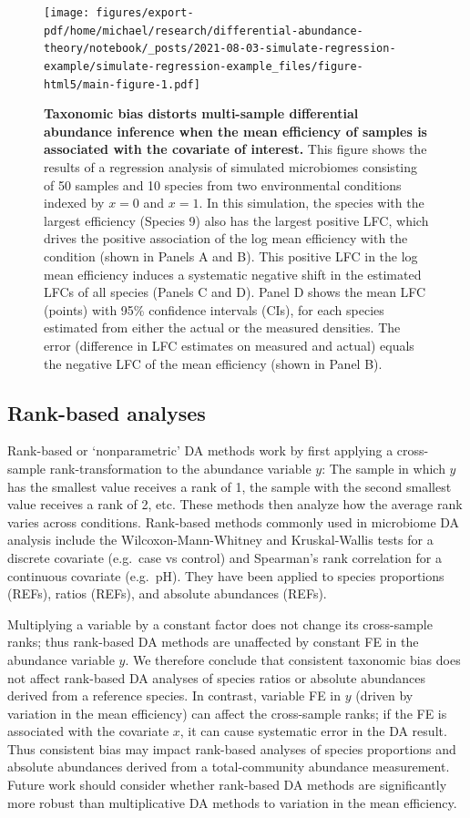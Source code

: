 \documentclass[
]{article}
\begin{document}
\begin{figure}
\centering
\texttt{[image: figures/export-pdf/home/michael/research/differential-abundance-theory/notebook/\_posts/2021-08-03-simulate-regression-example/simulate-regression-example\_files/figure-html5/main-figure-1.pdf]}
\caption{\label{fig:regression-example}\textbf{Taxonomic bias distorts multi-sample differential abundance inference when the mean efficiency of samples is associated with the covariate of interest.} This figure shows the results of a regression analysis of simulated microbiomes consisting of 50 samples and 10 species from two environmental conditions indexed by \(x=0\) and \(x=1\). In this simulation, the species with the largest efficiency (Species 9) also has the largest positive LFC, which drives the positive association of the log mean efficiency with the condition (shown in Panels A and B). This positive LFC in the log mean efficiency induces a systematic negative shift in the estimated LFCs of all species (Panels C and D). Panel D shows the mean LFC (points) with 95\% confidence intervals (CIs), for each species estimated from either the actual or the measured densities. The error (difference in LFC estimates on measured and actual) equals the negative LFC of the mean efficiency (shown in Panel B).}
\end{figure}



\hypertarget{rank-based-analyses}{%
\subsection{Rank-based analyses}\label{rank-based-analyses}}

Rank-based or `nonparametric' DA methods work by first applying a cross-sample rank-transformation to the abundance variable \(y\): The sample in which \(y\) has the smallest value receives a rank of 1, the sample with the second smallest value receives a rank of 2, etc.
These methods then analyze how the average rank varies across conditions.
Rank-based methods commonly used in microbiome DA analysis include the Wilcoxon-Mann-Whitney and Kruskal-Wallis tests for a discrete covariate (e.g.~case vs control) and Spearman's rank correlation for a continuous covariate (e.g.~pH).
They have been applied to species proportions (REFs), ratios (REFs), and absolute abundances (REFs).

Multiplying a variable by a constant factor does not change its cross-sample ranks; thus rank-based DA methods are unaffected by constant FE in the abundance variable \(y\).
We therefore conclude that consistent taxonomic bias does not affect rank-based DA analyses of species ratios or absolute abundances derived from a reference species.
In contrast, variable FE in \(y\) (driven by variation in the mean efficiency) can affect the cross-sample ranks; if the FE is associated with the covariate \(x\), it can cause systematic error in the DA result.
Thus consistent bias may impact rank-based analyses of species proportions and absolute abundances derived from a total-community abundance measurement.
Future work should consider whether rank-based DA methods are significantly more robust than multiplicative DA methods to variation in the mean efficiency.
\end{document}
